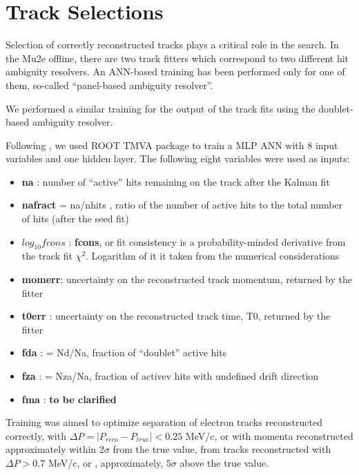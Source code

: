 \section{Track Selections}

Selection of correctly reconstructed tracks plays a critical role in the search.
In the Mu2e offline, there are two track fitters which correspond to two different
hit ambiguity resolvers. An ANN-based training has been performed only for one of them,
so-called ``panel-based ambiguity resolver''.

We performed a similar training for the output of the track fits using the doublet-based
ambiguity resolver.

Following \cite{MU2E_4595_ANN_TRAINING}, we used ROOT TMVA package to train a MLP ANN
with 8 input variables and one hidden layer. The following eight variables were used as inputs:

\begin{itemize}
\item
  {\bf na }: number of ``active'' hits remaining on the track after the Kalman fit
\item
  {\bf  nafract} = na/nhits , ratio of the number of active hits to the total number of hits
  (after the seed fit)
\item
  $log_{10}{fcons}$ : {\bf fcons}, or fit consistency is a probability-minded derivative
  from the track fit $\chi^2$. Logarithm of it it taken from the numerical considerations
\item
  {\bf momerr}: uncertainty on the reconstructed track momentum, returned by the fitter
\item
  {\bf t0err} : uncertainty on the reconstructed track time, T0, returned by the fitter
\item
  {\bf fda} : = Nd/Na, fraction of ``doublet'' active hits
\item
  {\bf fza } : = Nza/Na, fraction of activev hits with undefined drift direction
\item
  {\bf fma } : {\bf \red to be clarified}
\end{itemize}

Training was aimed to optimize separation of electron tracks reconstructed correctly, 
with $\Delta{P} = |P_{reco}-P_{true}| < 0.25$ MeV/c, or with momenta reconstructed approximately
within $2\sigma$ from the true value, from tracks reconstructed
with $\Delta{P} > 0.7$ MeV/c, or , approximately, $5\sigma$ above the true value.

